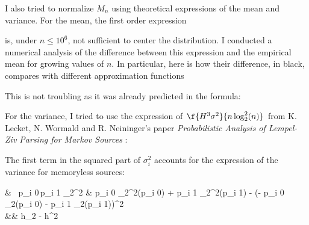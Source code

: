 	\pagebreak
	\noindent
	I also tried to normalize $M_n$ using theoretical expressions
	of the mean and variance. For the mean, the first order expression
	
	
	\noindent
	is, under $n\leq 10^6$, not sufficient to center the distribution. I conducted a numerical analysis
	of the difference between this expression and the empirical mean for growing 
	values of $n$. In particular, here is how their difference, in black, compares with
	different approximation functions 
	
	
	\noindent
	This is not troubling as it was already predicted in the formula:
	
	
	\pagebreak
	\noindent
	For the variance, I tried to use the expression
	of $\f{H^3 \sigma^2}{n \log_2^2 (n)}$ from K. Lecket, N. Wormald and R. Neininger's paper 
		\textit{Probabilistic Analysis of Lempel-Ziv Parsing for Markov Sources} :
		

	
	\begin{remarque}
	\noindent 
	The first term in the squared part of $\sigma_i^2$ accounts for the expression of the variance for memoryless sources:
	
	\begin{egalites}
	& \ p_{i 0}\,p_{i 1} \log_2^2 
		& p_{i 0} \log_2^2(p_{i 0}) + p_{i 1} \log_2^2(p_{i 1}) 
			- (- p_{i 0} \log_2(p_{i 0})  - p_{i 1} \log_2(p_{i 1}))^2 \\
		&& h_2 - h^2
	\end{egalites}
	
	\end{remarque}	
	
